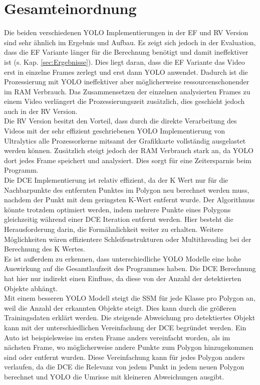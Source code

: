 {	\section{Gesamteinordnung}
	{ 
	Die beiden verschiedenen YOLO Implementierungen in der EF und RV Version sind sehr ähnlich im Ergebnis und Aufbau. Es zeigt sich jedoch in der Evaluation, dass die EF Variante länger für die Berechnung benötigt und damit ineffektiver ist (s. Kap. \ref{sec:Ergebnisse}). Dies liegt daran, dass die EF Variante das Video erst in einzelne Frames zerlegt und erst dann YOLO anwendet. Dadurch ist die Prozessierung mit YOLO ineffektiver aber möglicherweise ressourcenschonender im RAM Verbrauch.  Das Zusammensetzen der einzelnen analysierten Frames zu einem Video verlängert die Prozessierungszeit zusätzlich, dies geschieht jedoch auch in der RV Version. \\
	Die RV Version besitzt den Vorteil, dass durch die direkte Verarbeitung des Videos mit der sehr effizient geschriebenen YOLO Implementierung von Ultralytics alle Prozessorkerne mitsamt der Grafikkarte vollständig ausgelastet werden können. Zusätzlich steigt jedoch der RAM Verbrauch stark an, da YOLO dort jedes Frame speichert und analysiert. Dies sorgt für eine Zeitersparnis beim Programm. \\ 
	Die DCE Implementierung ist relativ effizient, da der K Wert nur für die Nachbarpunkte des entfernten Punktes im Polygon neu berechnet werden muss, nachdem der Punkt mit dem geringsten K-Wert entfernt wurde. Der Algorithmus könnte trotzdem optimiert werden, indem mehrere Punkte eines Polygons gleichzeitig während einer DCE Iteration entfernt werden. Hier besteht die Herausforderung darin, die Formähnlichkeit weiter zu erhalten. Weitere Möglichkeiten wären effizientere Schleifenstrukturen oder Multithreading bei der Berechnung des K Wertes. \\
	Es ist außerdem zu erkennen, dass unterschiedliche YOLO Modelle eine hohe Auswirkung auf die Gesamtlaufzeit des Programmes haben. Die DCE Berechnung hat hier nur indirekt einen Einfluss, da diese von der Anzahl der detektierten Objekte abhängt. \\
	
	Mit einem besseren YOLO Modell steigt die SSM für jede Klasse pro Polygon an, weil die Anzahl der erkannten Objekte steigt. Dies kann durch die größeren Trainingsdaten erklärt werden. Die steigende Abweichung pro detektiertes Objekt kann mit der unterschiedlichen Vereinfachung der DCE begründet werden. Ein Auto ist beispielsweise im ersten Frame anders vereinfacht worden, als im nächsten Frame, wo möglicherweise andere Punkte zum Polygon hinzugekommen sind oder entfernt wurden. Diese Vereinfachung kann für jedes Polygon anders verlaufen, da die DCE die Relevanz von jedem Punkt in jedem neuen Polygon berechnet und YOLO die Umrisse mit kleineren Abweichungen ausgibt.

}}
